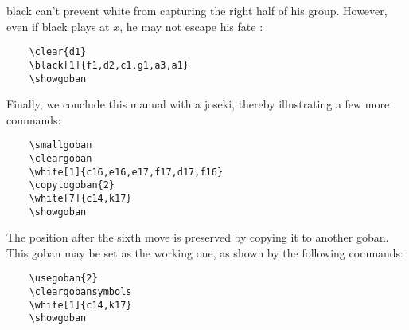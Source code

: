 \documentclass[fleqn]{article}
\begin{document}
black can't prevent white from capturing the right half of his group. However, even if black plays at $x$, he may not escape his fate :

\medskip
\begin{minipage}[c][1.0\height][c]{0.45\textwidth}
\begin{verbatim}
	\clear{d1}
	\black[1]{f1,d2,c1,g1,a3,a1}
	\showgoban
\end{verbatim}
\end{minipage}
%
\begin{minipage}[c][1.0\height][c]{0.45\textwidth}
\begin{center}
	\showgoban
\end{center}
\end{minipage}

Finally, we conclude this manual with a joseki, thereby illustrating a few more commands:

\medskip
\begin{minipage}[c][1.0\height][c]{0.45\textwidth}
\begin{verbatim}
	\smallgoban
	\cleargoban
	\white[1]{c16,e16,e17,f17,d17,f16}
	\copytogoban{2}
	\white[7]{c14,k17}
	\showgoban
\end{verbatim}
\end{minipage}
%
\begin{minipage}[c][1.0\height][c]{0.45\textwidth}
\begin{center}
	\smallgoban
	\cleargoban
	\showgoban
\end{center}
\end{minipage}

The position after the sixth move is preserved by copying it to another goban. This goban may be set as the working one, as shown by the following commands:

\medskip
\begin{minipage}[c][1.0\height][c]{0.45\textwidth}
\begin{verbatim}
	\usegoban{2}
	\cleargobansymbols
	\white[1]{c14,k17}
	\showgoban
\end{verbatim}
\end{minipage}
%
\begin{minipage}[c][1.0\height][c]{0.45\textwidth}
\begin{center}
	\cleargobansymbols
	\showgoban
\end{center}
\end{minipage}
\end{document}
